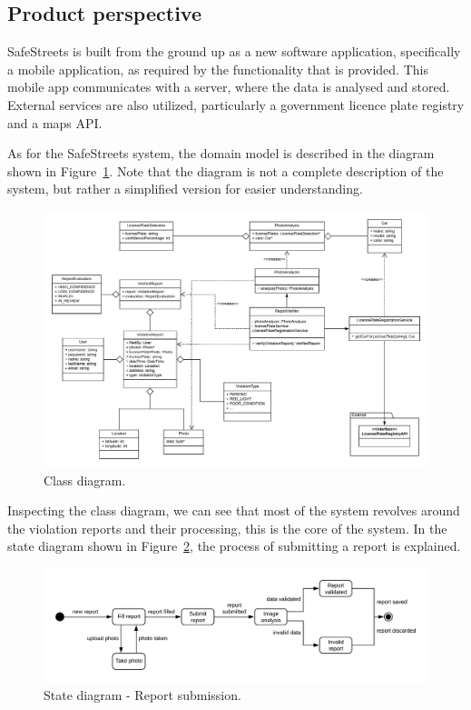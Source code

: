 \subsection{Product perspective}

SafeStreets is built from the ground up as a new software application, specifically a mobile application, as required by the functionality that is provided. This mobile app communicates with a server, where the data is analysed and stored. External services are also utilized, particularly a government licence plate registry and a maps API.

As for the SafeStreets system, the domain model is described in the diagram shown in Figure~\ref{fig:class-general}. Note that the diagram is not a complete description of the system, but rather a simplified version for easier understanding.

\begin{figure}[!h]
\centering
\includegraphics[width=\textwidth]{Images/class-general.png}
\caption{\label{fig:class-general}Class diagram.}
\end{figure}

Inspecting the class diagram, we can see that most of the system revolves around the violation reports and their processing, this is the core of the system.
In the state diagram shown in Figure~\ref{fig:state-report-submission}, the process of submitting a report is explained.

\begin{figure}[!h]
\centering
\includegraphics[width=\textwidth]{Images/state-report-submission.png}
\caption{\label{fig:state-report-submission}State diagram - Report submission.}
\end{figure}

